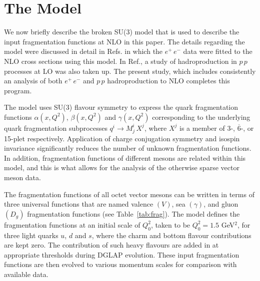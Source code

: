 \documentclass{ws-ijmpa}
\begin{document}
\section{The Model}
\label{Mod}
We now briefly describe the broken SU(3) model that is used to describe
the input fragmentation functions at NLO in this paper. The details
regarding the model were discussed in detail in Refs.\cite{Indu,Savilo,Savinlo} in which the $e^+\,e^-$ data were fitted
to the NLO cross sections using this model. In Ref.\cite{Savilo},
a study of hadroproduction in $p\,p$ processes at LO was also taken
up. The present study, which includes consistently an analysis of both
$e^+\,e^-$ and $p\,p$ hadroproduction to NLO completes this program.

The model uses SU(3) flavour symmetry to express the quark fragmentation
functions $\alpha(x, Q^2)$, $\beta(x, Q^2)$ and $\gamma(x, Q^2)$
corresponding to the underlying quark fragmentation subprocesses $q^i \to
M^i_j \, X^j$, where $X^j$ is a member of 3-, $\overline{6}$-, or 15-plet
respectively. Application of charge conjugation symmetry and isospin
invariance significantly reduces the number of unknown fragmentation
functions. In addition, fragmentation functions of different mesons are
related within this model, and this is what allows for the analysis of
the otherwise sparse vector meson data.

The fragmentation functions of all octet vector mesons can be written
in terms of three universal functions that are named valence $(V)$,
sea $(\gamma)$, and gluon $(D_g)$ fragmentation functions\cite{Savinlo}
(see Table~\ref{tab:frag}). The model defines the fragmentation functions
at an initial scale of $Q_0^2$, taken to be $Q_0^2 =1.5$ GeV$^2$, for
three light quarks $u$, $d$ and $s$, where the charm and bottom flavour
contributions are kept zero. The contribution of such heavy flavours are
added in at appropriate thresholds during DGLAP evolution. These input
fragmentation functions are then evolved to various momentum scales for
comparison with available data.
\end{document}
